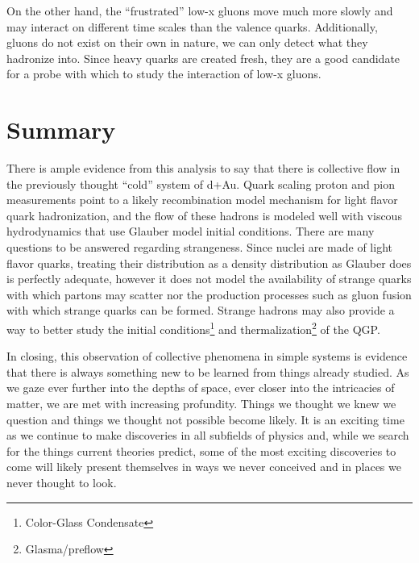 On the other hand, the ``frustrated'' low-x gluons move much more slowly and may interact on different time scales than the valence quarks. Additionally, gluons do not exist on their own in nature, we can only detect what they hadronize into. Since heavy quarks are created fresh, they are a good candidate for a probe with which to study the interaction of low-x gluons.

\section{Summary}
There is ample evidence from this analysis to say that there is collective flow in the previously thought ``cold'' system of d+Au. Quark scaling proton and pion measurements point to a likely recombination model mechanism for light flavor quark hadronization, and the flow of these hadrons is modeled well with viscous hydrodynamics that use Glauber model initial conditions. There are many questions to be answered regarding strangeness. Since nuclei are made of light flavor quarks, treating their distribution as a density distribution as Glauber does is perfectly adequate, however it does not model the availability of strange quarks with which partons may scatter nor the production processes such as gluon fusion with which strange quarks can be formed. Strange hadrons may also provide a way to better study the initial conditions\footnote{Color-Glass Condensate} and thermalization\footnote{Glasma/preflow} of the QGP. 

In closing, this observation of collective phenomena in simple systems is evidence that there is always something new to be learned from things already studied. As we gaze ever further into the depths of space, ever closer into the intricacies of matter, we are met with increasing profundity. Things we thought we knew we question and things we thought not possible become likely. It is an exciting time as we continue to make discoveries in all subfields of physics and, while we search for the things current theories predict, some of the most exciting discoveries to come will likely present themselves in ways we never conceived and in places we never thought to look. 

\pagebreak
\pagebreak


